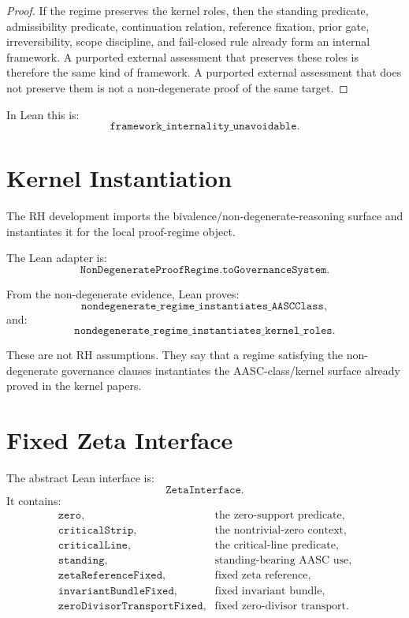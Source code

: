 \documentclass[11pt]{article}
\begin{document}
\begin{proof}
If the regime preserves the kernel roles, then the standing predicate,
admissibility predicate, continuation relation, reference fixation, prior
gate, irreversibility, scope discipline, and fail-closed rule already form an
internal framework.  A purported external assessment that preserves these
roles is therefore the same kind of framework.  A purported external
assessment that does not preserve them is not a non-degenerate proof of the
same target.
\end{proof}

In Lean this is:
\[
\texttt{framework\_internality\_unavoidable}.
\]

\section{Kernel Instantiation}

The RH development imports the bivalence/non-degenerate-reasoning surface and
instantiates it for the local proof-regime object.

The Lean adapter is:
\[
\texttt{NonDegenerateProofRegime.toGovernanceSystem}.
\]

From the non-degenerate evidence, Lean proves:
\[
\texttt{nondegenerate\_regime\_instantiates\_AASCClass},
\]
and:
\[
\texttt{nondegenerate\_regime\_instantiates\_kernel\_roles}.
\]

These are not RH assumptions.  They say that a regime satisfying the
non-degenerate governance clauses instantiates the AASC-class/kernel surface
already proved in the kernel papers.

\section{Fixed Zeta Interface}

The abstract Lean interface is:
\[
\texttt{ZetaInterface}.
\]
It contains:
\[
\begin{array}{ll}
\texttt{zero}, & \text{the zero-support predicate},\\
\texttt{criticalStrip}, & \text{the nontrivial-zero context},\\
\texttt{criticalLine}, & \text{the critical-line predicate},\\
\texttt{standing}, & \text{standing-bearing AASC use},\\
\texttt{zetaReferenceFixed}, & \text{fixed zeta reference},\\
\texttt{invariantBundleFixed}, & \text{fixed invariant bundle},\\
\texttt{zeroDivisorTransportFixed}, & \text{fixed zero-divisor transport}.
\end{array}
\]
\end{document}
